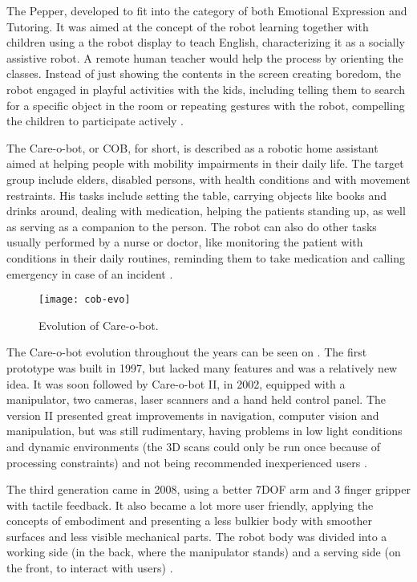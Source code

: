 The Pepper, developed to fit into the category of both Emotional Expression and Tutoring. It was aimed at the concept of the robot learning together with children using a the robot display to teach English, characterizing it as a socially assistive robot. A remote human teacher would help the process by orienting the classes. Instead of just showing the contents in the screen creating boredom, the robot engaged in playful activities with the kids, including telling them to search for a specific object in the room or repeating gestures with the robot, compelling the children to participate actively \cite{tanaka2015pepper}.

The Care-o-bot, or COB, for short, is described as a robotic home assistant aimed at helping people with mobility impairments in their daily life. The target group include elders, disabled persons, with health conditions and with movement restraints. His tasks include setting the table, carrying objects like books and drinks around, dealing with medication, helping the patients standing up, as well as serving as a companion to the person. The robot can also do other tasks usually performed by a nurse or doctor, like monitoring the patient with conditions in their daily routines, reminding them to take medication and calling emergency in case of an incident \cite{graf2004care}.

\begin{figure}[!ht]
    \centering
    \texttt{[image: cob-evo]}
    \caption{Evolution of Care-o-bot.}
    \label{fig:cob-evo}
\end{figure}

The Care-o-bot evolution throughout the years can be seen on . The first prototype was built in 1997, but lacked many features and was a relatively new idea. It was soon followed by Care-o-bot II, in 2002, equipped with a manipulator, two cameras, laser scanners and a hand held control panel. The version II presented great improvements in navigation, computer vision and manipulation, but was still rudimentary, having problems in low light conditions and dynamic environments (the 3D scans could only be run once because of processing constraints) and not being recommended inexperienced users \cite{graf2004care}.

The third generation came in 2008, using a better 7DOF arm and 3 finger gripper with tactile feedback. It also became a lot more user friendly, applying the concepts of embodiment and presenting a less bulkier body with smoother surfaces and less visible mechanical parts. The robot body was divided into a working side (in the back, where the manipulator stands) and a serving side (on the front, to interact with users) \cite{graf2009robotic}.


